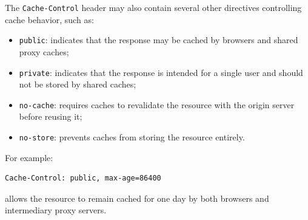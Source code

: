 \documentclass{scrbook}
\begin{document}
\begin{itemize}
		The \texttt{Cache-Control} header may also contain several other directives controlling cache behavior, such as:
		\begin{itemize}
			\item
			\texttt{public}: indicates that the response may be cached by browsers and shared proxy caches;
			
			\item
			\texttt{private}: indicates that the response is intended for a single user and should not be stored by shared caches;
			
			\item
			\texttt{no-cache}: requires caches to revalidate the resource with the origin server before reusing it;
			
			\item
			\texttt{no-store}: prevents caches from storing the resource entirely.
		\end{itemize}
		
		For example:
		
		\begin{lstlisting}
Cache-Control: public, max-age=86400
		\end{lstlisting}
		
		allows the resource to remain cached for one day by both browsers and intermediary proxy servers.
	\end{itemize}
	
\end{document}
